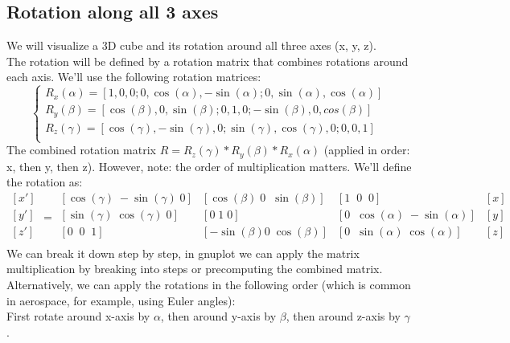\documentclass[a4paper,10pt]{article}
\begin{document}
\subsection{Rotation along all 3 axes}
We will visualize a 3D cube and its rotation around all three axes (x, y, z).\\
The rotation will be defined by a rotation matrix that combines rotations around each axis.
We'll use the following rotation matrices:
\[
\begin{cases}
   R_x(\alpha) = [1, 0, 0; 0, \cos(\alpha), -\sin(\alpha); 0, \sin(\alpha), \cos(\alpha)]\\
   R_y(\beta) = [\cos(\beta), 0, \sin(\beta); 0, 1, 0; -\sin(\beta), 0, cos(\beta)]\\
   R_z(\gamma) = [\cos(\gamma), -\sin(\gamma), 0; \sin(\gamma), \cos(\gamma), 0; 0, 0, 1]\\
\end{cases}
\]
The combined rotation matrix \(R = R_z(\gamma) * R_y(\beta) * R_x(\alpha) \) (applied in order: x, then y, then z).
However, note: the order of multiplication matters. We'll define the rotation as:
\[
\begin{matrix}
 [x']\\
 [y']\\
 [z']\\
\end{matrix}
=
\begin{matrix}
[\cos(\gamma)\; -\sin(\gamma)\; 0]& [\cos(\beta)\;  0\;\;  \sin(\beta)]& [1\;\;     0\;\;      0   ]\\
[\sin(\gamma)\;  \cos(\gamma)\; 0]& [0\;       1\;     0   ]& [0\;\;  \cos(\alpha)\; -\sin(\alpha)]\\
[0 \;\;      0\;\;      1]& [-\sin(\beta) 0\;  \cos(\beta)]& [0\;\;  \sin(\alpha)\;  \cos(\alpha)]\\
\end{matrix}
\begin{matrix}
[x]\\
[y]\\
[z]\\
\end{matrix}
\]
We can break it down step by step, in gnuplot we can apply the matrix multiplication by breaking into steps or precomputing the combined matrix.\\
Alternatively, we can apply the rotations in the following order (which is common in aerospace, for example, using Euler angles):\\
First rotate around x-axis by \( \alpha\), then around y-axis by \(\beta\), then around z-axis by \(\gamma\).
\end{document}

